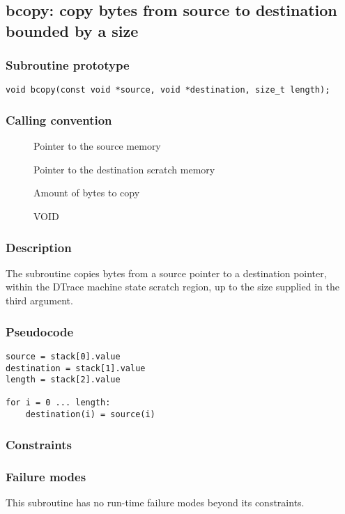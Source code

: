 \clearpage
{}
{}
\label{subr:bcopy}
\subsection*{bcopy: copy bytes from source to destination bounded by a
size}

\subsubsection*{Subroutine prototype}

\begin{verbatim}
void bcopy(const void *source, void *destination, size_t length);
\end{verbatim}

\subsubsection*{Calling convention}

\begin{description}
\item[] Pointer to the source memory
\item[] Pointer to the destination scratch memory
\item[] Amount of bytes to copy
\item[] VOID
\end{description}

\subsubsection*{Description}

The  subroutine copies bytes from a source pointer
to a destination pointer, within the DTrace machine state scratch
region, up to the size supplied in the third argument.
\subsubsection*{Pseudocode}

\begin{verbatim}
source = stack[0].value
destination = stack[1].value
length = stack[2].value

for i = 0 ... length:
    destination(i) = source(i)
\end{verbatim}

\subsubsection*{Constraints}

\subsubsection*{Failure modes}

This subroutine has no run-time failure modes beyond its constraints.
